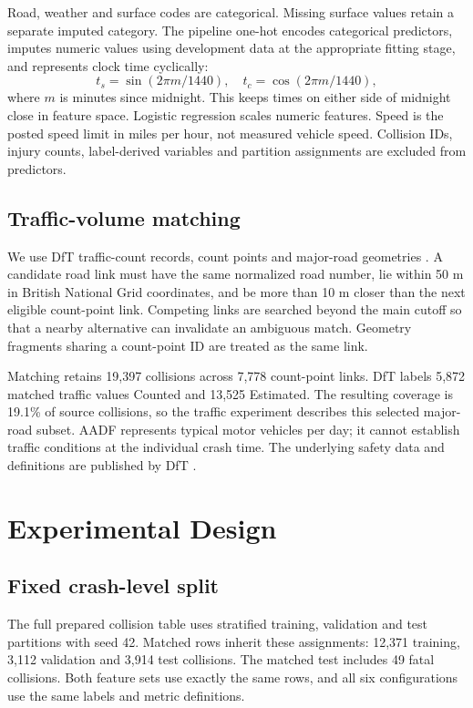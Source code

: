 \documentclass[conference]{IEEEtran}
\begin{document}
Road, weather and surface codes are categorical. Missing surface values retain a separate imputed category. The pipeline one-hot encodes categorical predictors, imputes numeric values using development data at the appropriate fitting stage, and represents clock time cyclically:
\begin{equation}
 t_s=\sin(2\pi m/1440),\quad t_c=\cos(2\pi m/1440),
\end{equation}
where $m$ is minutes since midnight. This keeps times on either side of midnight close in feature space. Logistic regression scales numeric features. Speed is the posted speed limit in miles per hour, not measured vehicle speed. Collision IDs, injury counts, label-derived variables and partition assignments are excluded from predictors.

\subsection{Traffic-volume matching}
We use DfT traffic-count records, count points and major-road geometries \cite{dfttraffic}. A candidate road link must have the same normalized road number, lie within 50 m in British National Grid coordinates, and be more than 10 m closer than the next eligible count-point link. Competing links are searched beyond the main cutoff so that a nearby alternative can invalidate an ambiguous match. Geometry fragments sharing a count-point ID are treated as the same link.

Matching retains 19,397 collisions across 7,778 count-point links. DfT labels 5,872 matched traffic values Counted and 13,525 Estimated. The resulting coverage is 19.1\% of source collisions, so the traffic experiment describes this selected major-road subset. AADF represents typical motor vehicles per day; it cannot establish traffic conditions at the individual crash time. The underlying safety data and definitions are published by DfT \cite{dftsafety}.

\section{Experimental Design}
\subsection{Fixed crash-level split}
The full prepared collision table uses stratified training, validation and test partitions with seed 42. Matched rows inherit these assignments: 12,371 training, 3,112 validation and 3,914 test collisions. The matched test includes 49 fatal collisions. Both feature sets use exactly the same rows, and all six configurations use the same labels and metric definitions.
\end{document}
